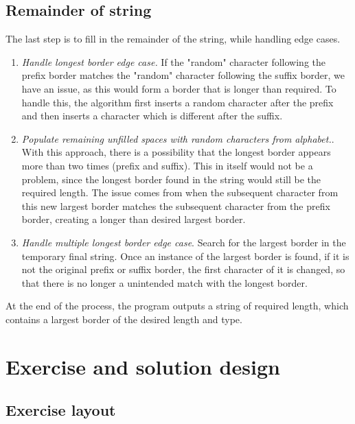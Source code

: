 \documentclass{l4proj}
\begin{document}
\subsection{Remainder of string}
\label{sec:remainder}

The last step is to fill in the remainder of the string, while handling edge cases.

\begin{enumerate}[i]
	\item
	\emph{Handle longest border edge case.}  If the "random" character following the prefix border matches the "random" character following the suffix border, we have an issue, as this would form a border that is longer than required. To handle this, the algorithm first inserts a random character after the prefix and then inserts a character which is different after the suffix.

	\item
	\emph{Populate remaining unfilled spaces with random characters from alphabet.}. With this approach, there is a possibility that the longest border appears more than two times (prefix and suffix). This in itself would not be a problem, since the longest border found in the string would still be the required length. The issue comes from when the subsequent character from this new largest border matches the subsequent character from the prefix border, creating a longer than desired largest border.

	\item
	\emph{Handle multiple longest border edge case}. Search for the largest border in the temporary final string. Once an instance of the largest border is found, if it is not the original prefix or suffix border, the first character of it is changed, so that there is no longer a unintended match with the longest border.
\end{enumerate}

At the end of the process, the program outputs a string of required length, which contains a largest border of the desired length and type.

\section{Exercise and solution design}

\subsection{Exercise layout}
\label{sec:KMPExerciseDesign}
\end{document}
